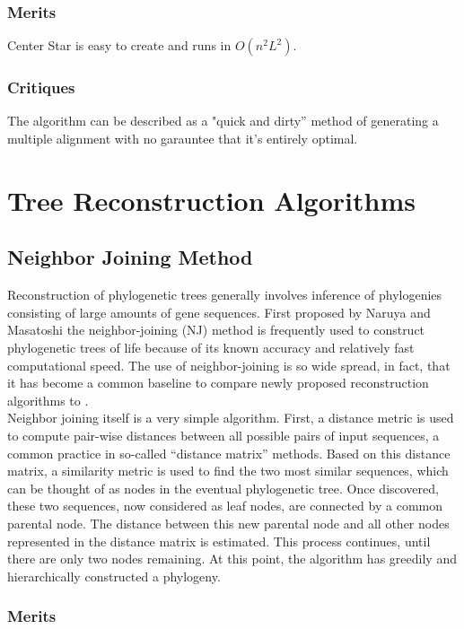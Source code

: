 \documentclass[10pt,twocolumn]{article}
\begin{document}
\subsubsection*{Merits}
Center Star is easy to create and runs in $O(n^2L^2)$.

\subsubsection*{Critiques}
The algorithm can be described as a "quick and dirty'' method of generating a multiple alignment with no garauntee that it's entirely optimal.


\section*{Tree Reconstruction Algorithms}
\subsection*{Neighbor Joining Method}

Reconstruction of phylogenetic trees generally involves inference of phylogenies consisting of large amounts of gene sequences. First proposed by Naruya and Masatoshi \cite{saitou1987neighbor} the neighbor-joining (NJ) method is frequently used to construct phylogenetic trees of life because of its known accuracy and relatively fast computational speed. The use of neighbor-joining is so wide spread, in fact, that it has become a common baseline to compare newly proposed reconstruction algorithms to \cite{mihaescu2009neighbor}.\\

Neighbor joining itself is a very simple algorithm. First, a distance metric is used to compute pair-wise distances between all possible pairs of input sequences, a common practice in so-called ``distance matrix'' methods. Based on this distance matrix, a similarity metric is used to find the two most similar sequences, which can be thought of as nodes in the eventual phylogenetic tree. Once discovered, these two sequences, now considered as leaf nodes, are connected by a common parental node. The distance between this new parental node and all other nodes represented in the distance matrix is estimated. This process continues, until there are only two nodes remaining. At this point, the algorithm has greedily and hierarchically constructed a phylogeny.

\subsubsection*{Merits}
\end{document}
